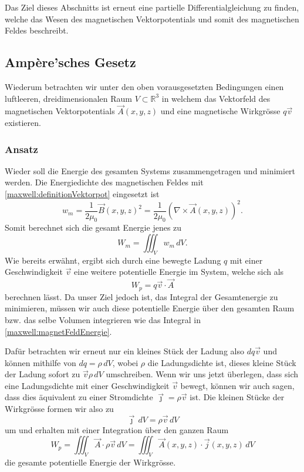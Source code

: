 Das Ziel dieses Abschnitts ist erneut eine partielle Differentialgleichung zu finden, welche das Wesen des magnetischen Vektorpotentials und somit des magnetischen Feldes beschreibt.


\subsection{Ampère'sches Gesetz}

Wiederum betrachten wir unter den oben vorausgesetzten Bedingungen einen luftleeren, dreidimensionalen Raum $V \subset \mathbb{R}^3$ in welchem das Vektorfeld des magnetischen Vektorpotentials $\vec{A}(x,y,z)$ und eine magnetische Wirkgrösse $q\vec{v}$  existieren.


\subsubsection{Ansatz}

Wieder soll die Energie des gesamten Systems zusammengetragen und minimiert werden. 
Die Energiedichte des magnetischen Feldes mit \ref{maxwell:definitionVektorpot} eingesetzt ist
\[ w_m 
= 
\frac{1}{2\mu_0}\vec{B}(x,y,z)^2
=
\frac{1}{2\mu_0}\left(\nabla\times\vec{A}(x,y,z)\right)^2. \]
Somit berechnet sich die gesamt Energie jenes zu 
\begin{equation}
	\label{maxwell:magnetFeldEnergie}
	W_m = \iiint_V w_m\, dV.
\end{equation}
Wie bereits erwähnt, ergibt sich durch eine bewegte Ladung $q$ mit einer Geschwindigkeit $\vec{v}$ eine weitere potentielle Energie im System, welche sich als 
\[ 
W_{p}
= 
q\vec{v}
\cdot
\vec{A}
 \]
berechnen lässt.
Da unser Ziel jedoch ist, das Integral der Gesamtenergie zu minimieren, müssen wir auch diese potentielle Energie über den gesamten Raum bzw. das selbe Volumen integrieren wie das Integral in \ref{maxwell:magnetFeldEnergie}. 

Dafür betrachten wir erneut nur ein kleines Stück der Ladung also $dq\vec{v}$ und können mithilfe von $dq = \rho\,dV$, wobei $\rho$ die Ladungsdichte ist, dieses kleine Stück der Ladung sofort zu $\vec{v}\rho\,dV$ umschreiben.
Wenn wir uns jetzt überlegen, dass sich eine Ladungsdichte mit einer Geschwindigkeit $\vec{v}$ bewegt, können wir auch sagen, dass dies äquivalent zu einer Stromdichte $\vec{\jmath}=\rho\vec{v}$ ist. 
Die kleinen Stücke der Wirkgrösse formen wir also zu \[\vec{\jmath}\,dV = \rho\vec{v}\,dV\]
um und erhalten mit einer Integration über den ganzen Raum
\begin{equation}
	W_p
	= 
	\iiint_V \vec{A}\cdot\rho\vec{v}\,dV
	=
	\iiint_V \vec{A}(x,y,z)\cdot\vec{j}(x,y,z)\,dV
\end{equation}
die gesamte potentielle Energie der Wirkgrösse.

